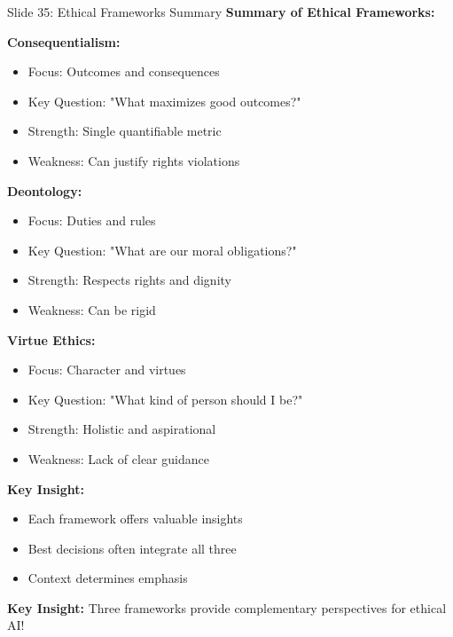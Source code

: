 \documentclass[8pt]{beamer}
\begin{document}
	\begin{frame}{Slide 35: Ethical Frameworks Summary}
		\fontsize{6.5}{7.5}\selectfont
		\textbf{Summary of Ethical Frameworks:}
		
		\vspace{0.1cm}
		\textbf{Consequentialism:}
		\begin{itemize}
			\item Focus: Outcomes and consequences
			\item Key Question: "What maximizes good outcomes?"
			\item Strength: Single quantifiable metric
			\item Weakness: Can justify rights violations
		\end{itemize}
		
		\vspace{0.1cm}
		\textbf{Deontology:}
		\begin{itemize}
			\item Focus: Duties and rules
			\item Key Question: "What are our moral obligations?"
			\item Strength: Respects rights and dignity
			\item Weakness: Can be rigid
		\end{itemize}
		
		\vspace{0.1cm}
		\textbf{Virtue Ethics:}
		\begin{itemize}
			\item Focus: Character and virtues
			\item Key Question: "What kind of person should I be?"
			\item Strength: Holistic and aspirational
			\item Weakness: Lack of clear guidance
		\end{itemize}
		
		\vspace{0.1cm}
		\textbf{Key Insight:}
		\begin{itemize}
			\item Each framework offers valuable insights
			\item Best decisions often integrate all three
			\item Context determines emphasis
		\end{itemize}
		
		\textcolor{myblue}{\textbf{Key Insight:}} Three frameworks provide \textcolor{myblue}{complementary perspectives} for ethical AI!
	\end{frame}
	
\end{document}

